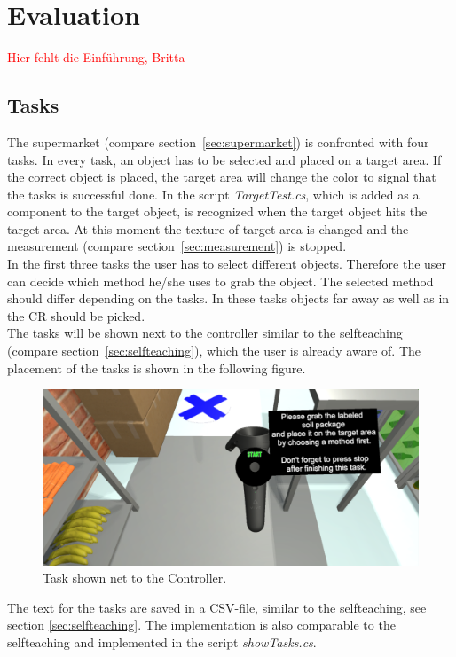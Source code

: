 \section{Evaluation} \label{sec:evaluation}
\textcolor{red}{Hier fehlt die Einführung, Britta}

\subsection{Tasks} \label{sec:tasks}
The supermarket (compare section~\ref{sec:supermarket}) is confronted with four tasks. In every task, an object has to be selected and placed on a target area. If the correct object is placed, the target area will change the color to signal that the tasks is successful done. In the script \textit{TargetTest.cs}, which is added as a component to the target object, is recognized when the target object hits the target area. At this moment the texture of target area is changed and the measurement (compare section~\ref{sec:measurement}) is stopped. \\
In the first three tasks the user has to select different objects. Therefore the user can decide which method he/she uses to grab the object. The selected method should differ depending on the tasks. In these tasks objects far away as well as in the CR should be picked. \\
The tasks will be shown next to the controller similar to the selfteaching (compare section~\ref{sec:selfteaching}), which the user is already aware of. The placement of the tasks is shown in the following figure. 

\begin{figure}[H] 
	\center 
	\includegraphics[width=12cm]{Images/TaskContreoller.PNG}
	\caption[Task shown next to the Controller.]{Task shown net to the Controller.}
	\label{fig:taskC}
\end{figure} 

The text for the tasks are saved in a CSV-file, similar to the selfteaching, see section \ref{sec:selfteaching}. The implementation is also comparable to the selfteaching and implemented in the script \textit{showTasks.cs}.

